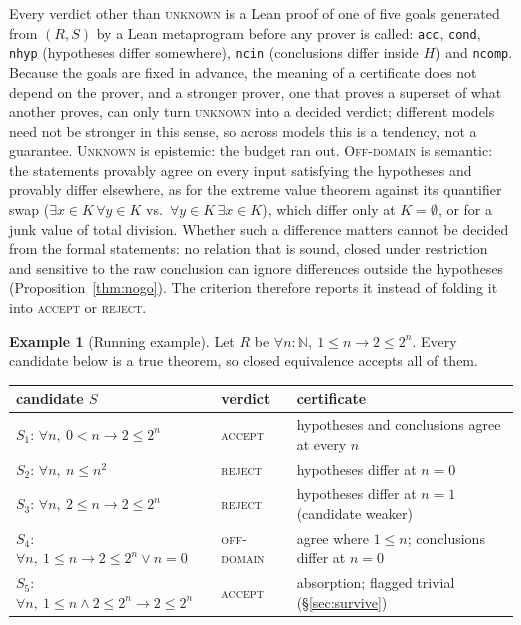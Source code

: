 \documentclass[10pt]{article}
\theoremstyle{definition}
\newtheorem{example}[theorem]{Example}
\newcommand{\V}[1]{\textsc{#1}}
\begin{document}
Every verdict other than \V{unknown} is a Lean proof of one of five goals generated from
$(R,S)$ by a Lean metaprogram before any prover is called: \texttt{acc}, \texttt{cond},
\texttt{nhyp} (hypotheses differ somewhere), \texttt{ncin} (conclusions differ inside $H$) and
\texttt{ncomp}. Because the goals are fixed in advance, the meaning of a certificate does not
depend on the prover, and a stronger prover, one that proves a superset of what another proves,
can only turn \V{unknown} into a decided verdict; different models need not be stronger in this
sense, so across models this is a tendency, not a guarantee.
\V{Unknown} is epistemic: the budget ran out. \V{Off-domain} is semantic: the statements
provably agree on every input satisfying the hypotheses and provably differ elsewhere, as for
the extreme value theorem against its quantifier swap ($\exists x\in K\,\forall y\in K$ vs.\
$\forall y\in K\,\exists x\in K$), which differ only at $K=\emptyset$, or for a junk value of total
division. Whether such a difference matters cannot be decided from the formal statements: no
relation that is sound, closed under restriction and sensitive to the raw conclusion can ignore
differences outside the hypotheses (Proposition~\ref{thm:nogo}). The criterion therefore reports
it instead of folding it into \V{accept} or \V{reject}.

\begin{example}[Running example]\label{ex:run}
Let $R$ be $\forall n{:}\mathbb N,\ 1\le n\to 2\le 2^n$. Every candidate below is a true theorem,
so closed equivalence accepts all of them.
\begin{center}\small
\begin{tabular}{lll}
\toprule
candidate $S$ & verdict & certificate\\
\midrule
$S_1$: $\forall n,\ 0<n\to 2\le 2^n$ & \V{accept} & hypotheses and conclusions agree at every $n$\\
$S_2$: $\forall n,\ n\le n^2$ & \V{reject} & hypotheses differ at $n=0$\\
$S_3$: $\forall n,\ 2\le n\to 2\le 2^n$ & \V{reject} & hypotheses differ at $n=1$ (candidate weaker)\\
$S_4$: $\forall n,\ 1\le n\to 2\le 2^n\vee n=0$ & \V{off-domain} & agree where $1\le n$; conclusions differ at $n=0$\\
$S_5$: $\forall n,\ 1\le n\wedge 2\le 2^n\to 2\le 2^n$ & \V{accept} & absorption; flagged trivial (\S\ref{sec:survive})\\
\bottomrule
\end{tabular}
\end{center}
\end{example}
\end{document}
